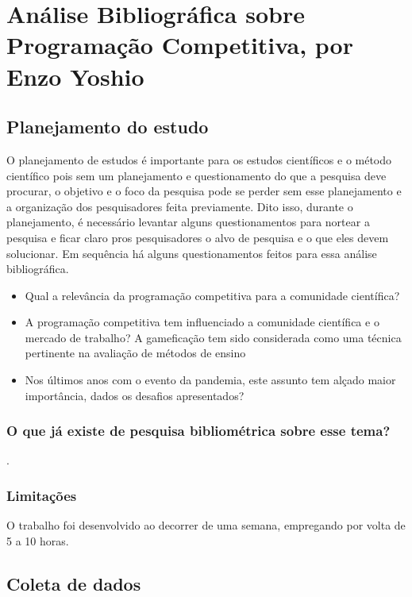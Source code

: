 \chapter{Análise Bibliográfica sobre Programação Competitiva, por Enzo Yoshio \label{chap:bibliometria:}}

\section{Planejamento do estudo\label{}}

    O planejamento de estudos é importante para os estudos científicos e o método científico pois sem um planejamento e questionamento do que a pesquisa deve procurar, o objetivo e o foco da pesquisa pode se perder sem esse planejamento e a organização dos pesquisadores feita previamente. Dito isso, durante o planejamento, é necessário levantar alguns questionamentos para nortear a pesquisa e ficar claro pros pesquisadores o alvo de pesquisa e o que eles devem solucionar. Em sequência há alguns questionamentos feitos para essa análise bibliográfica.
 

\begin{itemize}
    \item Qual a relevância da programação competitiva para a comunidade científica? 
    \item A programação competitiva tem influenciado a comunidade científica e o mercado de trabalho? 
    A gameficação tem sido considerada como uma técnica pertinente na avaliação de métodos de ensino
    \item Nos últimos anos com o evento da pandemia, este assunto tem alçado maior importância, dados os desafios apresentados?
\end{itemize}

\subsection{O que já existe de pesquisa bibliométrica sobre esse tema?}

\cite{} 
\cite{}.


\subsection{Limitações} O trabalho foi desenvolvido ao decorrer de uma semana, empregando por volta de 5 a 10 horas.

\section{Coleta de dados\label{MASSA:coleta}}

